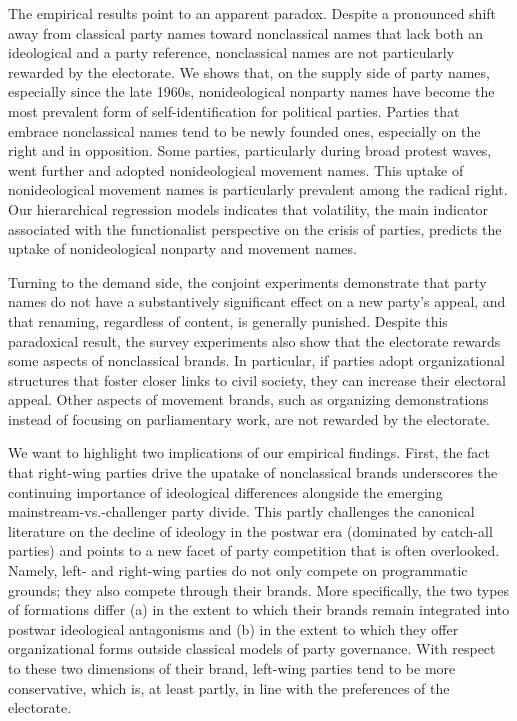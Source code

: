 \documentclass[12pt]{article}
\begin{document}
The empirical results point to an apparent paradox. Despite a pronounced shift away from classical party names toward nonclassical names that lack both an ideological and a party reference, nonclassical names are not particularly rewarded by the electorate. We shows that, on the supply side of party names, especially since the late 1960s, nonideological nonparty names have become the most prevalent form of self-identification for political parties. Parties that embrace nonclassical names tend to be newly founded ones, especially on the right and in opposition. Some parties, particularly during broad protest waves, went further and adopted nonideological movement names. This uptake of nonideological movement names is particularly prevalent among the radical right. Our hierarchical regression models indicates that volatility, the main indicator associated with the functionalist perspective on the crisis of parties, predicts the uptake of nonideological nonparty and movement names.

Turning to the demand side, the conjoint experiments demonstrate that party names do not have a substantively significant effect on a new party's appeal, and that renaming, regardless of content, is generally punished. Despite this paradoxical result, the survey experiments also show that the electorate rewards some aspects of nonclassical brands. In particular, if parties adopt organizational structures that foster closer links to civil society, they can increase their electoral appeal. Other aspects of movement brands, such as organizing demonstrations instead of focusing on parliamentary work, are not rewarded by the electorate.

We want to highlight two implications of our empirical findings. First, the fact that right-wing parties drive the upatake of nonclassical brands underscores the continuing importance of ideological differences alongside the emerging mainstream-vs.-challenger party divide. This partly challenges the canonical literature on the decline of ideology in the postwar era (dominated by catch-all parties) and points to a new facet of party competition that is often overlooked. Namely, left- and right-wing parties do not only compete on programmatic grounds; they also compete through their brands. More specifically, the two types of formations differ (a) in the extent to which their brands remain integrated into postwar ideological antagonisms and (b) in the extent to which they offer organizational forms outside classical models of party governance. With respect to these two dimensions of their brand, left-wing parties tend to be more conservative, which is, at least partly, in line with the preferences of the electorate.
\end{document}
